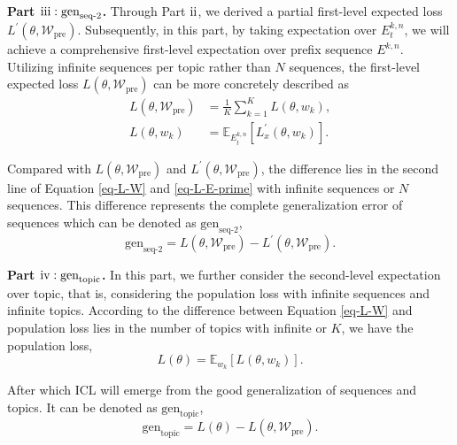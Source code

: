 \textbf{Part $\text{\uppercase\expandafter{\romannumeral3}}: \text{gen}_\text{seq-2}$.} Through Part $\text{\uppercase\expandafter{\romannumeral2}}$, we derived a partial first-level expected loss $L^\prime(\theta,\mathcal{W}_{\text{pre}})$. Subsequently, in this part, by taking expectation over $E^{k,n}_{t}$, we will achieve a comprehensive first-level expectation over prefix sequence $E^{k,n}$. Utilizing infinite sequences per topic rather than $N$ sequences, the first-level expected loss $L(\theta,\mathcal{W}_{\text{pre}})$ can be more concretely described as
\begin{align}
	L(\theta,\mathcal{W}_{\text{pre}})&=\frac{1}{K}\sum_{k=1}^K L(\theta, w_k), \nonumber \\ 
	L(\theta,w_k)&=\mathbb{E}_{E^{k,n}_t}\left[ L^\prime_{x}(\theta,w_k)\right]. \label{eq-L-W}
\end{align}

Compared with $L(\theta,\mathcal{W}_{\text{pre}})$ and $L^\prime(\theta,\mathcal{W}_{\text{pre}})$, the difference lies in the second line of Equation \ref{eq-L-W} and \ref{eq-L-E-prime} with infinite sequences or $N$ sequences. This difference represents the complete generalization error of sequences which can be denoted as $\text{gen}_\text{seq-2}$,
\begin{equation}\label{eq:gen-pre}
	\text{gen}_\text{seq-2}=L(\theta,\mathcal{W}_{\text{pre}})-L^\prime(\theta,\mathcal{W}_{\text{pre}}).
\end{equation}

\textbf{Part $\text{\uppercase\expandafter{\romannumeral4}}: \text{gen}_\text{topic}$.} In this part, we further consider the second-level expectation over topic, that is, considering the population loss with infinite sequences and infinite topics. According to the difference between Equation \ref{eq-L-W} and population loss lies in the number of topics with infinite  or $K$, we have the population loss,
\begin{equation}\label{eq-L-2}
	L(\theta)=\mathbb{E}_{w_k}\left[L(\theta,w_k)\right].
\end{equation}

After which ICL will emerge from the good generalization of sequences and topics. It can be denoted as $\text{gen}_\text{topic}$,
\begin{equation}\label{eq:gen-ICL}
	\text{gen}_\text{topic} = L(\theta) - L(\theta,\mathcal{W}_{\text{pre}}).
\end{equation}